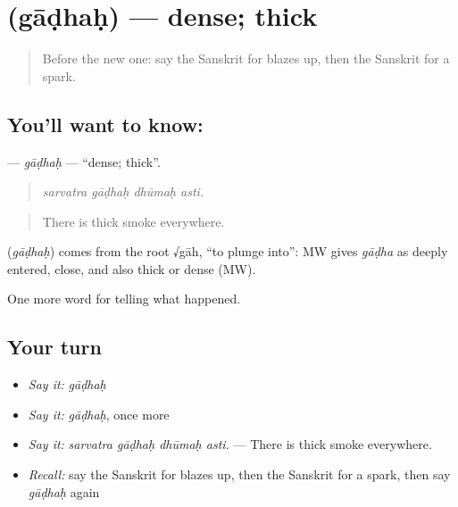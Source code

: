 \section[\texorpdfstring{\sk{गाढः} (gāḍhaḥ)}{गाढः (gāḍhaḥ)}]{ (gāḍhaḥ) — dense; thick}

\label{lesson:SA-C296-gadhah}



\begin{quote}
Before the new one: say the Sanskrit for blazes up, then the Sanskrit for a spark.
\end{quote}

\subsection*{You'll want to know: }
\textbf{} — \emph{gāḍhaḥ} — \textquotedblleft{}dense; thick\textquotedblright{}.

\begin{quote}
   
\end{quote}

\begin{quote}
\emph{sarvatra gāḍhaḥ dhūmaḥ asti.}
\end{quote}

\begin{quote}
There is thick smoke everywhere.
\end{quote}

\begin{cousinweb}
\textbf{} (\emph{gāḍhaḥ}) comes from the root √gāh, \textquotedblleft{}to plunge into\textquotedblright{}: MW gives \emph{gāḍha} as deeply entered, close, and also thick or dense (MW).
\end{cousinweb}

\begin{grammarlens}[title={What you've built}]
One more word for telling what happened.
\end{grammarlens}

\subsection*{Your turn}
\begin{itemize}
\raggedright
  \item \emph{Say it:} \emph{gāḍhaḥ}
  \item \emph{Say it:} \emph{gāḍhaḥ}, once more
  \item \emph{Say it:} \emph{sarvatra gāḍhaḥ dhūmaḥ asti.} — There is thick smoke everywhere.
  \item \emph{Recall:} say the Sanskrit for blazes up, then the Sanskrit for a spark, then say \emph{gāḍhaḥ} again
\end{itemize}

